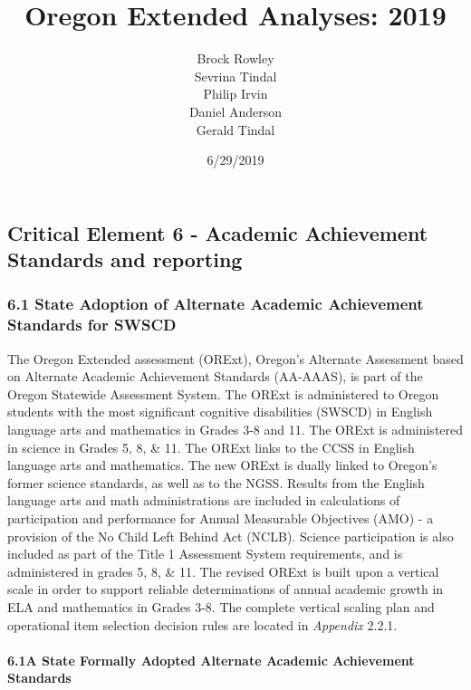 \documentclass[]{article}
\title{Oregon Extended Analyses: 2019}
\author{Brock Rowley \\ Sevrina Tindal \\ Philip Irvin \\ Daniel Anderson \\ Gerald Tindal}
\date{6/29/2019}
\let\oldparagraph\paragraph
\renewcommand{\paragraph}[1]{\oldparagraph{#1}\mbox{}}
\begin{document}
\maketitle

{
\setcounter{tocdepth}{5}
\tableofcontents
}
\hypertarget{critical-element-6---academic-achievement-standards-and-reporting}{%
\subsection{Critical Element 6 - Academic Achievement Standards and
reporting}\label{critical-element-6---academic-achievement-standards-and-reporting}}

\hypertarget{state-adoption-of-alternate-academic-achievement-standards-for-swscd}{%
\subsubsection{6.1 State Adoption of Alternate Academic Achievement
Standards for
SWSCD}\label{state-adoption-of-alternate-academic-achievement-standards-for-swscd}}

The Oregon Extended assessment (ORExt), Oregon's Alternate Assessment
based on Alternate Academic Achievement Standards (AA-AAAS), is part of
the Oregon Statewide Assessment System. The ORExt is administered to
Oregon students with the most significant cognitive disabilities (SWSCD)
in English language arts and mathematics in Grades 3-8 and 11. The ORExt
is administered in science in Grades 5, 8, \& 11. The ORExt links to the
CCSS in English language arts and mathematics. The new ORExt is dually
linked to Oregon's former science standards, as well as to the NGSS.
Results from the English language arts and math administrations are
included in calculations of participation and performance for Annual
Measurable Objectives (AMO) - a provision of the No Child Left Behind
Act (NCLB). Science participation is also included as part of the Title
1 Assessment System requirements, and is administered in grades 5, 8, \&
11. The revised ORExt is built upon a vertical scale in order to support
reliable determinations of annual academic growth in ELA and mathematics
in Grades 3-8. The complete vertical scaling plan and operational item
selection decision rules are located in \emph{Appendix} 2.2.1.

\hypertarget{a-state-formally-adopted-alternate-academic-achievement-standards}{%
\paragraph{6.1A State Formally Adopted Alternate Academic Achievement
Standards}\label{a-state-formally-adopted-alternate-academic-achievement-standards}}
\end{document}
